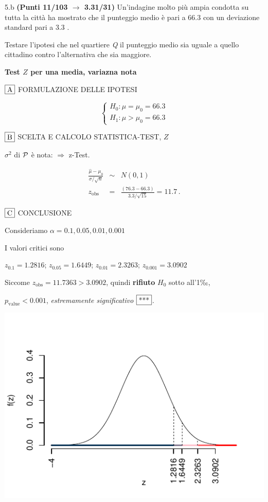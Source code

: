 \documentclass[
  11pt,
]{book}
\theoremstyle{mytheoremstyle}
\theoremstyle{mydefstyle}
\newenvironment{sol}
  {
  \begin{tcolorbox}[enhanced,breakable,arc=0.1mm,boxrule=1pt,colback=white,colframe=iblue,
  title=\bf \fontfamily{lmss}\selectfont \hspace{.5 cm} Soluzione,drop fuzzy shadow]

}{
\end{tcolorbox}
  }
\begin{document}
5.b \textbf{(Punti 11/103 \(\rightarrow\) 3.31/31)} Un'indagine molto più ampia condotta su tutta la città ha mostrato che
il punteggio medio è pari a 66.3 con un deviazione standard pari a 3.3 .

Testare l'ipotesi che nel quartiere \emph{Q} il punteggio medio sia uguale a quello cittadino contro l'alternativa che sia maggiore.

\begin{sol}
\textbf{Test \(Z\) per una media, variazna nota}

\(\fbox{A}\) FORMULAZIONE DELLE IPOTESI

\[\begin{cases}
   H_0: \mu = \mu_0=66.3 \\
   H_1: \mu > \mu_0=66.3 
   \end{cases}\]

\(\fbox{B}\) SCELTA E CALCOLO STATISTICA-TEST, \(Z\)

\(\sigma^{2}\) di \(\cal{P}\) è nota: \(\Rightarrow\) z-Test.

\begin{eqnarray*}
   \frac{\hat\mu - \mu_{0}} {\sigma/\sqrt{n}}&\sim&N(0,1)\\
   z_{\text{obs}}
   &=& \frac{ ( 76.3 -  66.3 )} { 3.3 /\sqrt{ 15 }}
   =   11.7 \, .
   \end{eqnarray*}

\(\fbox{C}\) CONCLUSIONE

Consideriamo \(\alpha=0.1, 0.05, 0.01, 0.001\)

I valori critici sono

\(z_{0.1}=1.2816\); \(z_{0.05}=1.6449\); \(z_{0.01}=2.3263\); \(z_{0.001}=3.0902\)

Siccome \(z_\text{obs}=11.7363>3.0902\), quindi \textbf{rifiuto} \(H_0\) sotto all'1‰,

\(p_\text{value}<0.001\), \emph{estremamente significativo} \(\fbox{***}\).

\begin{center}\includegraphics{Esami_passati_con_soluzioni_files/figure-latex/2022-72-1} \end{center}


\end{sol}
\end{document}
